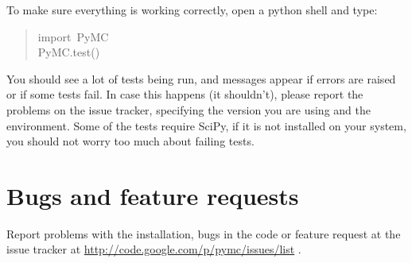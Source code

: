 To make sure everything is working correctly, open a python shell and type:
\begin{quote}{\ttfamily \raggedright \noindent
import~PyMC~\\
PyMC.test()
}\end{quote}

You should see a lot of tests being run, and messages appear if errors are
raised or if some tests fail. In case this happens (it shouldn't), please report
the problems on the issue tracker, specifying the version you are using and the
environment. Some of the tests require SciPy, if it is not installed on your
system, you should not worry too much about failing tests.



\hypertarget{bugs-and-feature-requests}{}
\section*{Bugs and feature requests}
\label{bugs-and-feature-requests}

Report problems with the installation, bugs in the code or feature request at
the issue tracker at \href{http://code.google.com/p/pymc/issues/list}{http://code.google.com/p/pymc/issues/list} .

\